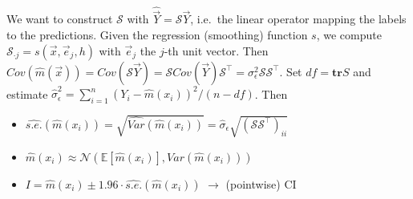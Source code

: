 \begin{sectionbox}\nospacing{}
  We want to construct $\mathcal{S}$ with $\hat{\vec{Y}} = \mathcal{S}\vec{Y}$, i.e.\ the linear operator mapping the labels to the predictions.
  Given the regression (smoothing) function $s$, we compute $\mathcal{S}_{\cdot j} = s(\vec{x}, \vec{e}_{j}, h)$ with $\vec{e}_{j}$ the $j$-th unit vector.
  Then $Cov(\hat m(\vec{x})) = Cov(\mathcal{S} \vec{Y}) = \mathcal{S} Cov(\vec{Y}) \mathcal{S}^{\top} = \sigma_{\epsilon}^{2}\mathcal{S}\mathcal{S}^{\top}$. Set $df=\mathbf{tr}S$ and 
  estimate $\hat{\sigma}_{\epsilon}^{2} = \sum_{i=1}^{n}{(Y_{i} - \hat m(x_{i}))}^{2}/(n-df)$.
  Then
  \begin{itemize}
    \item $\widehat{s.e.}(\hat m(x_{i})) = \sqrt{\widehat{Var}(\hat m(x_{i}))} = \hat \sigma_{\epsilon} \sqrt{{(\mathcal{S}\mathcal{S}^{\top})}_{ii}}$
    \item $\hat m(x_{i}) \approx \mathcal{N}\left(\mathbb{E}[\hat m(x_{i})], Var(\hat m(x_{i}))\right)$
    \item $I = \hat m(x_{i}) \pm 1.96 \cdot \widehat{s.e.}(\hat m(x_{i}))$ $\rightarrow$ (pointwise) CI
  \end{itemize}
\end{sectionbox}

